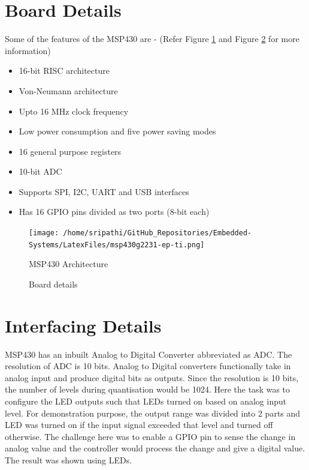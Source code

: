\documentclass[12pt, letterpaper]{article}
\begin{document}
\section{Board Details}

Some of the features of the MSP430 are - (Refer Figure \ref{fig:architecture} and Figure \ref{fig:board} for more information)

\begin{itemize}
	\item 16-bit RISC architecture
	\item Von-Neumann architecture
	\item Upto 16 MHz clock frequency
	\item Low power consumption and five power saving modes
	\item 16 general purpose registers
	\item 10-bit ADC
	\item Supports SPI, I2C, UART and USB interfaces
	\item Has 16 GPIO pins divided as two ports (8-bit each)
\end{itemize}
	
\begin{figure}[t]
	\centering
	\texttt{[image: /home/sripathi/GitHub\_Repositories/Embedded-Systems/LatexFiles/msp430g2231-ep-ti.png]}
	\caption{MSP430 Architecture}
	\label{fig:architecture}
\end{figure}

\begin{figure}[t]
	\centering
	\caption{Board details}
	\label{fig:board}
\end{figure}

\section{Interfacing Details}
      
MSP430 has an inbuilt Analog to Digital Converter abbreviated as ADC. The resolution of ADC is 10 bits. Analog to Digital converters functionally take in analog input and produce digital bits as outputs. Since the resolution is 10 bits, the number of levels during quantisation would be 1024. Here the task was to configure the LED outputs such that LEDs turned on based on analog input level. For demonstration purpose, the output range was divided into 2 parts and LED was turned on if the input signal exceeded that level and turned off otherwise. The challenge here was to enable a GPIO pin to sense the change in analog value and the controller would process the change and give a digital value. The result was shown using LEDs.
\end{document}
